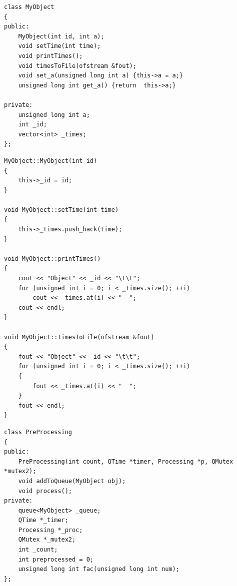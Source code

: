 \documentclass[a4paper,14pt]{report}
\begin{document}
\begin{lstlisting}[label=some-code,caption=Объявление класса MyObject]
class MyObject
{
public:
    MyObject(int id, int a);
    void setTime(int time);
    void printTimes();
    void timesToFile(ofstream &fout);
    void set_a(unsigned long int a) {this->a = a;}
    unsigned long int get_a() {return  this->a;}

private:
    unsigned long int a;
    int _id;
    vector<int> _times;
};
\end{lstlisting}

\begin{lstlisting}[label=some-code,caption=Реализация класса MyObject]
MyObject::MyObject(int id)
{
    this->_id = id;
}

void MyObject::setTime(int time)
{
    this->_times.push_back(time);
}

void MyObject::printTimes()
{
    cout << "Object" << _id << "\t\t";
    for (unsigned int i = 0; i < _times.size(); ++i)
        cout << _times.at(i) << "  ";
    cout << endl;
}

void MyObject::timesToFile(ofstream &fout)
{
    fout << "Object" << _id << "\t\t";
    for (unsigned int i = 0; i < _times.size(); ++i)
    {
        fout << _times.at(i) << "  ";
    }
    fout << endl;
}
\end{lstlisting}

\begin{lstlisting}[label=some-code,caption=Объявление класса PreProcessing]
class PreProcessing
{
public:
    PreProcessing(int count, QTime *timer, Processing *p, QMutex *mutex2);
    void addToQueue(MyObject obj);
    void process();
private:
    queue<MyObject> _queue;
    QTime *_timer;
    Processing *_proc;
    QMutex *_mutex2;
    int _count;
    int preprocessed = 0;
    unsigned long int fac(unsigned long int num);
};
\end{lstlisting}
\end{document}
